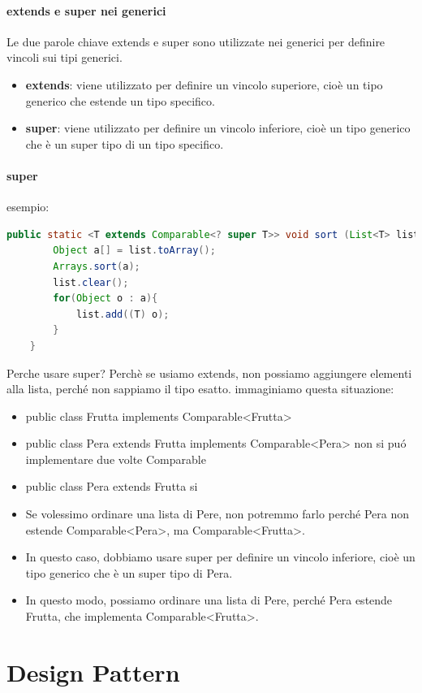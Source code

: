 \documentclass[11pt]{article}
\begin{document}
\paragraph{extends e super nei generici}
Le due parole chiave extends e super sono utilizzate nei generici per definire vincoli sui tipi generici.
\begin{itemize}
    \item \textbf{extends}: viene utilizzato per definire un vincolo superiore, cioè un tipo generico che estende un tipo specifico.
    \item \textbf{super}: viene utilizzato per definire un vincolo inferiore, cioè un tipo generico che è un super tipo di un tipo specifico.
    \end{itemize}
\paragraph{super}
esempio:
\begin{lstlisting}[language=Java]
    public static <T extends Comparable<? super T>> void sort (List<T> list){
        Object a[] = list.toArray();
        Arrays.sort(a);
        list.clear();
        for(Object o : a){
            list.add((T) o);
        }
    }
\end{lstlisting}
Perche usare super? Perchè se usiamo extends, non possiamo aggiungere elementi alla lista, perché non sappiamo il tipo esatto.
immaginiamo questa situazione:
\begin{itemize}
    \item public class Frutta implements Comparable<Frutta>
    \item public class Pera extends Frutta implements Comparable<Pera> non si puó implementare due volte Comparable
    \item public class Pera extends Frutta si
    \item Se volessimo ordinare una lista di Pere, non potremmo farlo perché Pera non estende Comparable<Pera>, ma Comparable<Frutta>.
    \item In questo caso, dobbiamo usare super per definire un vincolo inferiore, cioè un tipo generico che è un super tipo di Pera.
    \item In questo modo, possiamo ordinare una lista di Pere, perché Pera estende Frutta, che implementa Comparable<Frutta>.
    \end{itemize}
\section{Design Pattern}
\end{document}
